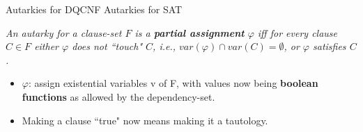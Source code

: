\documentclass[xcolor=table	]{beamer}
\begin{document}
\begin{frame}{Autarkies for DQCNF}
Autarkies for SAT \newline 

\textit{An autarky for a clause-set $F$ is a \textbf{partial assignment} $\varphi$ iff for every clause $C \in F$ either $\varphi$ does not ``touch" $C$, i.e., $var(\varphi) \cap var(C) = \emptyset$, \newline or $\varphi$ satisfies $C$.}\newline


\pause 

\begin{itemize}
	\item $\varphi$: 
	assign existential variables v of F, with values now being \newline \textbf{boolean functions} as allowed by the dependency-set.
	\item Making a clause ``true" now means making it a tautology.
\end{itemize}

%
\end{frame}
\end{document}
